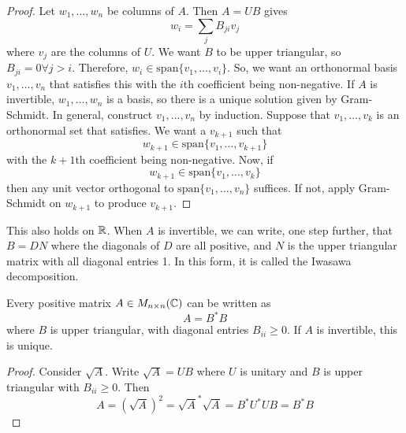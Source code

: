 \documentclass[12pt]{article}
\begin{document}
\begin{proof}
	Let $w_1,\dots,w_n$ be columns of $A$. Then $A=UB$ gives
	$$w_i = \sum_j B_{ji}v_j$$
	where $v_j$ are the columns of $U$. We want $B$ to be upper triangular, so $B_{ji} = 0 \forall j > i$. Therefore, $w_i \in \text{span}\{v_1,\dots,v_i\}$. So, we want an orthonormal basis $v_1,\dots,v_n$ that satisfies this with the $i$th coefficient being non-negative. If $A$ is invertible, $w_1,\dots,w_n$ is a basis, so there is a unique solution given by Gram-Schmidt. In general, construct $v_1,\dots,v_n$ by induction. Suppose that $v_1,\dots,v_k$ is an orthonormal set that satisfies. We want a $v_{k+1}$ such that
	$$w_{k+1} \in \text{span}\{v_1,\dots,v_{k+1}\}$$
	with the $k+1$th coefficient being non-negative. Now, if
	$$w_{k+1} \in \text{span}\{v_1,\dots,v_k\}$$
	then any unit vector orthogonal to $\text{span}\{v_1,\dots,v_n\}$ suffices. If not, apply Gram-Schmidt on $w_{k+1}$ to produce $v_{k+1}$.
\end{proof}

This also holds on $\mathbb{R}$. When $A$ is invertible, we can write, one step further, that $B=DN$ where the diagonals of $D$ are all positive, and $N$ is the upper triangular matrix with all diagonal entries 1. In this form, it is called the Iwasawa decomposition.

\begin{thm}
	Every positive matrix $A \in M_{n \times n}(\mathbb{C})$ can be written as
	$$A = B^*B$$
	where $B$ is upper triangular, with diagonal entries $B_{ii} \geq 0$. If $A$ is invertible, this is unique.
\end{thm}

\begin{proof}
	Consider $\sqrt{A}$. Write $\sqrt{A} = UB$ where $U$ is unitary and $B$ is upper triangular with $B_{ii} \geq 0$. Then
	$$A=(\sqrt{A})^2 = \sqrt{A}^*\sqrt{A} = B^*U^*UB = B^*B$$
\end{proof}
\end{document}
